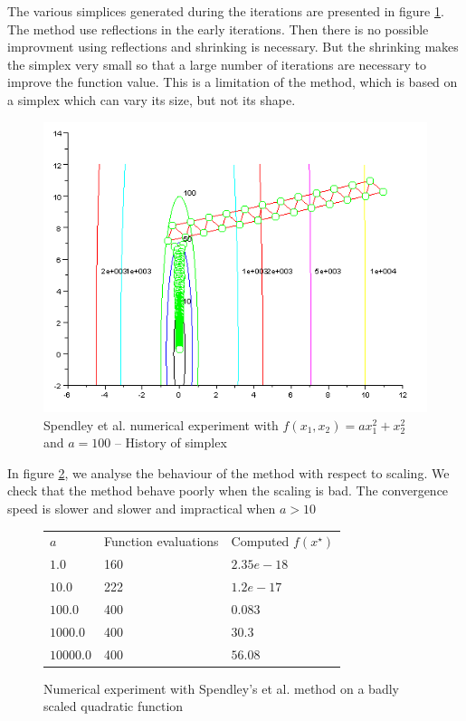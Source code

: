 The various simplices generated during the iterations are 
presented in figure \ref{fig-spendley-numexp2-historysimplex}.
The method use reflections in the early iterations. Then there
is no possible improvment using reflections and shrinking is necessary.
But the shrinking makes the simplex very small so that a large number of 
iterations are necessary to improve the function value.
This is a limitation of the method, which is based on a simplex 
which can vary its size, but not its shape.

\begin{figure}
\begin{center}
\includegraphics[width=15cm]{quad2-spendley-simplexcontours.png}
\end{center}
\caption{Spendley et al. numerical experiment with $f(x_1,x_2) = a x_1^2 + x_2^2$ and $a=100$ -- History of simplex}
\label{fig-spendley-numexp2-historysimplex}
\end{figure}

In figure \ref{fig-spendley-numexp2-scaling}, we analyse the 
behaviour of the method with respect to scaling.
We check that the method behave poorly when the scaling is 
bad. The convergence speed is slower and slower and impractical 
when $a>10$

\begin{figure}[htbp]
\begin{center}
\begin{tiny}
\begin{tabular}{|l|l|l|}
\hline
$a$ & Function evaluations & Computed $f(x^\star)$ \\
$1.0$ & 160 & $2.35e-18$ \\
$10.0$ & 222 & $1.2e-17$ \\
$100.0$ & 400 & $0.083$ \\
$1000.0$ & 400 & $30.3$ \\
$10000.0$ & 400 & $56.08$ \\
\hline
\end{tabular}
\end{tiny}
\end{center}
\caption{Numerical experiment with Spendley's et al. method on a badly scaled quadratic function}
\label{fig-spendley-numexp2-scaling}
\end{figure}

